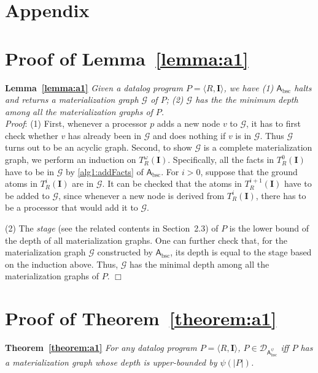 \section*{Appendix}

\appendix

\section{Proof of Lemma~\ref{lemma:a1}}

\textbf{Lemma~\ref{lemma:a1}}
\emph{Given a datalog program $P=\langle R, \textbf{I}\rangle$, we have
(1) $\mathsf{A}_{\text{bsc}}$ halts and returns a materialization graph $\mathcal{G}$ of $P$;
(2) $\mathcal{G}$ has the the minimum depth among all the materialization graphs of $P$.}\\

\noindent\emph{Proof}:
(1) First, whenever a processor $p$ adds a new node $v$ to $\mathcal{G}$, it has to first
check whether $v$ has already been in $\mathcal{G}$ and does nothing if $v$ is in $\mathcal{G}$.
Thus $\mathcal{G}$ turns out to be an acyclic graph.
Second, to show $\mathcal{G}$ is a
complete materialization graph, we perform an induction on $T_R^{\omega}(\textbf{I})$.
Specifically, all the facts in $T_R^{0}(\textbf{I})$ have to be in $\mathcal{G}$ by \ref{alg1:addFacts}
of $\mathsf{A}_{\text{bsc}}$.
For $i>0$, suppose that the ground atoms in $T_R^{i}(\textbf{I})$ are in $\mathcal{G}$.
It can be checked that the atoms in $T_R^{i+1}(\textbf{I})$ have to be
added to $\mathcal{G}$, since whenever a new node is derived from $T_R^{i}(\textbf{I})$,
there has to be a processor that would add it to $\mathcal{G}$.

(2) The \emph{stage} (see the related contents in Section~2.3) of $P$ is the lower bound of the depth
of all materialization graphs. One can further check that, for the materialization graph $\mathcal{G}$
constructed by $\mathsf{A}_{\text{bsc}}$, its depth is equal to the stage based on the induction above.
Thus, $\mathcal{G}$ has the minimal depth among all the materialization graphs of $P$. \hfill$\Box$

\section{Proof of Theorem~\ref{theorem:a1}}

\textbf{Theorem~\ref{theorem:a1}}
\emph{For any datalog program $P=\langle R, \textbf{I}\rangle$, $P\in\mathcal{D}_{\mathsf{A}_{\text{bsc}}^{\psi}}$ iff
$P$ has a materialization graph whose depth is upper-bounded by $\psi(|P|)$.}\\


